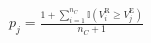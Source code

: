 \documentclass[border=8pt]{standalone}
\begin{document}
$\displaystyle p_j=\frac{1+\sum_{i=1}^{n_C}\mathbb{I}\!\left(V_i^{\mathrm{R}}\ge V_j^{\mathrm{E}}\right)}{n_C+1}$
\end{document}

